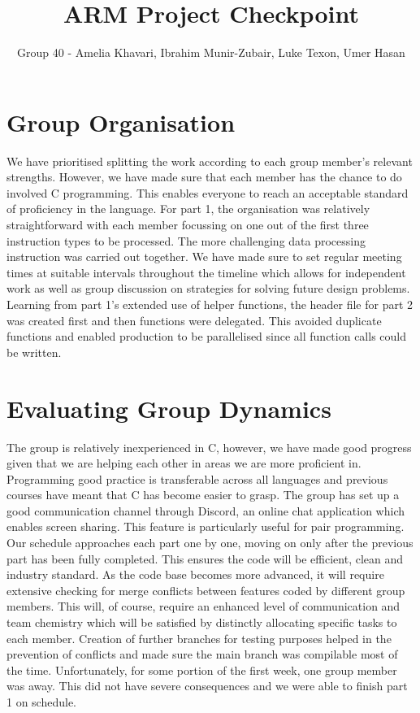 \documentclass[11pt]{article}
\begin{document}
\title{ARM Project Checkpoint}
\author{Group 40 - Amelia Khavari, Ibrahim Munir-Zubair, Luke Texon, Umer Hasan}

\maketitle

\section{Group Organisation}

We have prioritised splitting the work according to each group member's relevant strengths. However, we have made sure that each member has the chance to do involved C programming. This enables everyone to reach an acceptable standard of proficiency in the language. For part 1, the organisation was relatively straightforward with each member focussing on one out of the first three instruction types to be processed. The more challenging data processing instruction was carried out together. We have made sure to set regular meeting times at suitable intervals throughout the timeline which allows for independent work as well as group discussion on strategies for solving future design problems. Learning from part 1's extended use of helper functions, the header file for part 2 was created first and then functions were delegated. This avoided duplicate functions and enabled production to be parallelised since all function calls could be written.

\section{Evaluating Group Dynamics}

The group is relatively inexperienced in C, however, we have made good progress given that we are helping each other in areas we are more proficient in. Programming good practice is transferable across all languages and previous courses have meant that C has become easier to grasp. The group has set up a good communication channel through Discord, an online chat application which enables screen sharing. This feature is particularly useful for pair programming. Our schedule approaches each part one by one, moving on only after the previous part has been fully completed. This ensures the code will be efficient, clean and industry standard. As the code base becomes more advanced, it will require extensive checking for merge conflicts between features coded by different group members. This will, of course, require an enhanced level of communication and team chemistry which will be satisfied by distinctly allocating specific tasks to each member. Creation of further branches for testing purposes helped in the prevention of conflicts and made sure the main branch was compilable most of the time. Unfortunately, for some portion of the first week, one group member was away. This did not have severe consequences and we were able to finish part 1 on schedule. 
\end{document}
